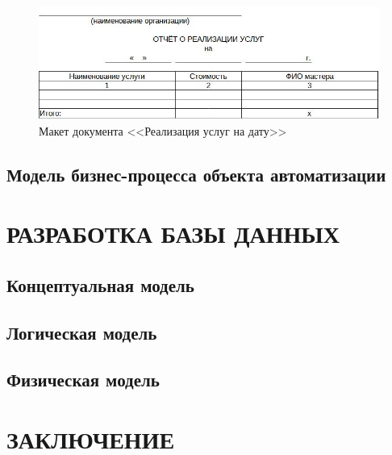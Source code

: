 \documentclass[12pt, a4paper, simple]{eskdtext}
\begin{document}
    \begin{figure}[!h]
        \centering
        \includegraphics[]
            {_docs/ОТ_РеализУслНаДату_макет.jpg}
        \caption{Макет документа <<Реализация услуг на дату>>}
        \label{fig:OT_RealizYslNaDaty_maket}
    \end{figure}

    \newpage
    \subsection{Модель бизнес-процесса объекта автоматизации}
    \newpage

    \section{РАЗРАБОТКА БАЗЫ ДАННЫХ}
    \subsection{Концептуальная модель}
    \subsection{Логическая модель}
    \subsection{Физическая модель}
    \newpage

    \newpage
    \section*{ЗАКЛЮЧЕНИЕ}
    \newpage

    \newpage
\end{document}
